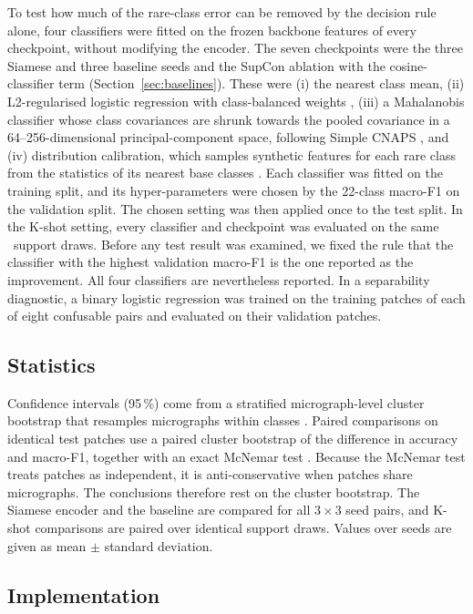 \documentclass[preprint,review,12pt]{elsarticle}
\begin{document}
To test how much of the rare-class error can be removed by the decision rule alone, four classifiers were fitted on the frozen backbone features of every checkpoint, without modifying the encoder. The seven checkpoints were the three Siamese and three baseline seeds and the SupCon ablation with the cosine-classifier term (Section~\ref{sec:baselines}). These were (i) the nearest class mean, (ii) L2-regularised logistic regression with class-balanced weights \cite{Tia20}, (iii) a Mahalanobis classifier whose class covariances are shrunk towards the pooled covariance in a 64--256-dimensional principal-component space, following Simple CNAPS \cite{Bat20}, and (iv) distribution calibration, which samples synthetic features for each rare class from the statistics of its nearest base classes \cite{Yan21}. Each classifier was fitted on the training split, and its hyper-parameters were chosen by the 22-class macro-F1 on the validation split. The chosen setting was then applied once to the test split. In the K-shot setting, every classifier and checkpoint was evaluated on the same \PairKOneDraws\ support draws. Before any test result was examined, we fixed the rule that the classifier with the highest validation macro-F1 is the one reported as the improvement. All four classifiers are nevertheless reported. In a separability diagnostic, a binary logistic regression was trained on the training patches of each of eight confusable pairs and evaluated on their validation patches.

\subsection{Statistics}
\label{sec:stats}

Confidence intervals (95\,\%) come from a stratified micrograph-level cluster bootstrap that resamples micrographs within classes \cite{ET93}. Paired comparisons on identical test patches use a paired cluster bootstrap of the difference in accuracy and macro-F1, together with an exact McNemar test \cite{McN47}. Because the McNemar test treats patches as independent, it is anti-conservative when patches share micrographs. The conclusions therefore rest on the cluster bootstrap. The Siamese encoder and the baseline are compared for all $3\times3$ seed pairs, and K-shot comparisons are paired over identical support draws. Values over seeds are given as mean $\pm$ standard deviation.

\subsection{Implementation}
\label{sec:impl}
\end{document}
